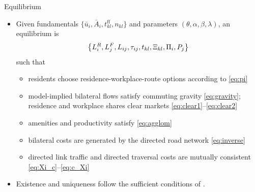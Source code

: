 \documentclass[11pt,aspectratio=169]{beamer}
\newcommand{\app}[1]{\allowbreak\hspace{0.25em}\hyperlink{#1}{\beamergotobutton{details}}}
\begin{document}
\begin{frame}[label=equilibrium]{Equilibrium}
\begin{itemize}
  \item Given fundamentals $\{\bar u_i,\bar A_i,t^{\text{ff}}_{kl},n_{kl}\}$ and parameters $(\theta,\alpha,\beta,\lambda)$, an equilibrium is
  \vspace{-0.5em}\begin{equation}
    \left\{L_i^R,L_j^F,L_{ij},\tau_{ij},t_{kl},\Xi_{kl},\Pi_i,P_j\right\}
  \vspace{-0.5em}\end{equation}
  such that
  \begin{itemize}
    \item residents choose residence-workplace-route options according to \eqref{eq:pi}
    \item model-implied bilateral flows satisfy commuting gravity \eqref{eq:gravity}; residence and workplace shares clear markets \eqref{eq:clear1}--\eqref{eq:clear2}
    \item amenities and productivity satisfy \eqref{eq:agglom}
    \item bilateral costs are generated by the directed road network \eqref{eq:inverse}
    \item directed link traffic and directed traversal costs are mutually consistent \eqref{eq:Xi_c}--\eqref{eq:c_Xi}
  \end{itemize}
  \item Existence and uniqueness follow the sufficient conditions of \citet[Proposition~1]{allenarkolakis2022}. \app{appexist}
\end{itemize}
\end{frame}

\end{document}
